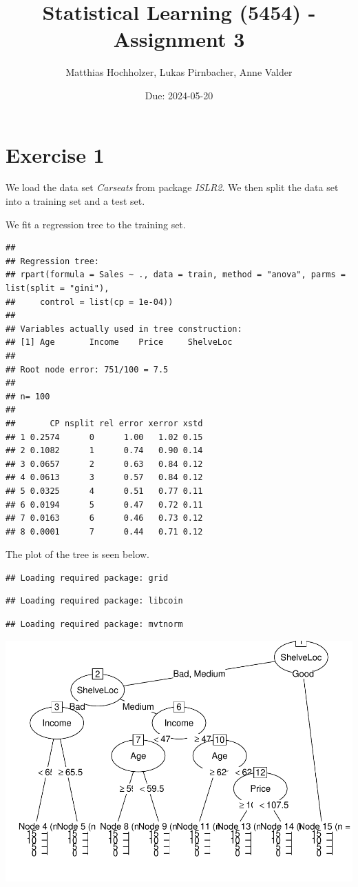 \documentclass[
]{article}
\title{Statistical Learning (5454) - Assignment 3}
\author{Matthias Hochholzer, Lukas Pirnbacher, Anne Valder}
\date{Due: 2024-05-20}
\begin{document}
\maketitle

\section{Exercise 1}\label{exercise-1}

We load the data set \textit{Carseats} from package \textit{ISLR2}. We
then split the data set into a training set and a test set.

We fit a regression tree to the training set.

\begin{verbatim}
## 
## Regression tree:
## rpart(formula = Sales ~ ., data = train, method = "anova", parms = list(split = "gini"), 
##     control = list(cp = 1e-04))
## 
## Variables actually used in tree construction:
## [1] Age       Income    Price     ShelveLoc
## 
## Root node error: 751/100 = 7.5
## 
## n= 100 
## 
##       CP nsplit rel error xerror xstd
## 1 0.2574      0      1.00   1.02 0.15
## 2 0.1082      1      0.74   0.90 0.14
## 3 0.0657      2      0.63   0.84 0.12
## 4 0.0613      3      0.57   0.84 0.12
## 5 0.0325      4      0.51   0.77 0.11
## 6 0.0194      5      0.47   0.72 0.11
## 7 0.0163      6      0.46   0.73 0.12
## 8 0.0001      7      0.44   0.71 0.12
\end{verbatim}

The plot of the tree is seen below.

\begin{verbatim}
## Loading required package: grid
\end{verbatim}

\begin{verbatim}
## Loading required package: libcoin
\end{verbatim}

\begin{verbatim}
## Loading required package: mvtnorm
\end{verbatim}

\includegraphics{A3_files/figure-latex/unnamed-chunk-5-1.pdf}
\end{document}

